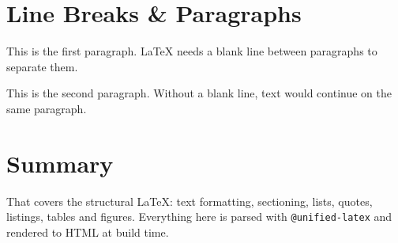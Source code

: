 \section{Line Breaks \& Paragraphs}

This is the first paragraph. LaTeX needs a blank line between paragraphs to separate them.

This is the second paragraph. Without a blank line, text would continue on the same paragraph.

\section{Summary}

That covers the structural LaTeX: text formatting, sectioning, lists, quotes, listings, tables and figures. Everything here is parsed with \texttt{@unified-latex} and rendered to HTML at build time.



